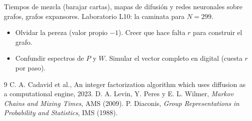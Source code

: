 \documentclass[11pt,a4paper]{article}
\begin{document}
\begin{aplicacion}
Tiempos de mezcla (barajar cartas), mapas de difusión y redes neuronales sobre grafos, grafos expansores. Laboratorio L10: la caminata para $N=299$.
\end{aplicacion}

\begin{error}
\begin{itemize}[nosep]
\item Olvidar la pereza (valor propio $-1$). \quad Creer que hace falta $r$ para construir el grafo.
\item Confundir espectros de $P$ y $W$. \quad Simular el vector completo en digital (cuesta $r$ por paso).
\end{itemize}
\end{error}

\begin{thebibliography}{9}\small
{} C. A. Cadavid et al., An integer factorization algorithm which uses diffusion as a computational engine, 2023.
 D. A. Levin, Y. Peres y E. L. Wilmer, \emph{Markov Chains and Mixing Times}, AMS (2009).
 P. Diaconis, \emph{Group Representations in Probability and Statistics}, IMS (1988).
\end{thebibliography}
\end{document}
